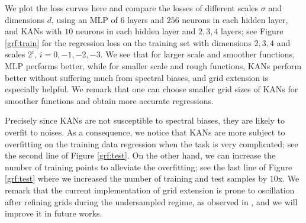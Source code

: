 \documentclass[12pt]{caltech_thesis}
\numberwithin{equation}{section}
\begin{document}
We plot the loss curves here and compare the losses of different scales $\sigma$ and dimensions $d$, using an MLP of $6$ layers and $256$ neurons in each hidden layer, and KANs with $10$ neurons in each hidden layer and $2,3,4$ layers; see Figure \ref{grf:train} for the regression loss on the training set with dimensions $2,3,4$ and scales $2^i$, $i=0,-1,-2,-3$. We see that for larger scale and smoother functions, MLP performs better, while for smaller scale and rough functions, KANs perform better without suffering much from spectral biases, and grid extension is especially helpful. We remark that one can choose smaller grid sizes of KANs for smoother functions and obtain more accurate regressions.

Precisely since KANs are not susceptible to spectral biases, they are likely to overfit to noises. As a consequence,
we notice that KANs are more subject to overfitting on the training data regression when the task is very complicated; see the second line of Figure \ref{grf:test}. On the other hand, we can increase the number of training points to alleviate the overfitting; see the last line of Figure \ref{grf:test} where we increased the number of training and test samples by $10$x. We remark that the current implementation of grid extension is prone to oscillation after refining grids during the undersampled regime, as observed in \cite{rigas2024adaptive}, and we will improve it in future works. 
\end{document}
